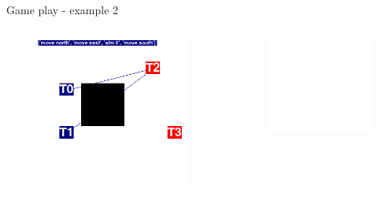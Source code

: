\documentclass{beamer}
\begin{document}
\begin{frame}{Game play - example 2}
\begin{columns}
\begin{figure}[htp]
  \centering
  \includegraphics[width=\textwidth]{images/iteration/screenshot03.png}
\end{figure}
\begin{figure}[htp]
  \centering
  \includegraphics[scale=0.5]{images/iteration/screenshot07.png}
\end{figure}

\end{columns}
\end{frame}
\end{document}
